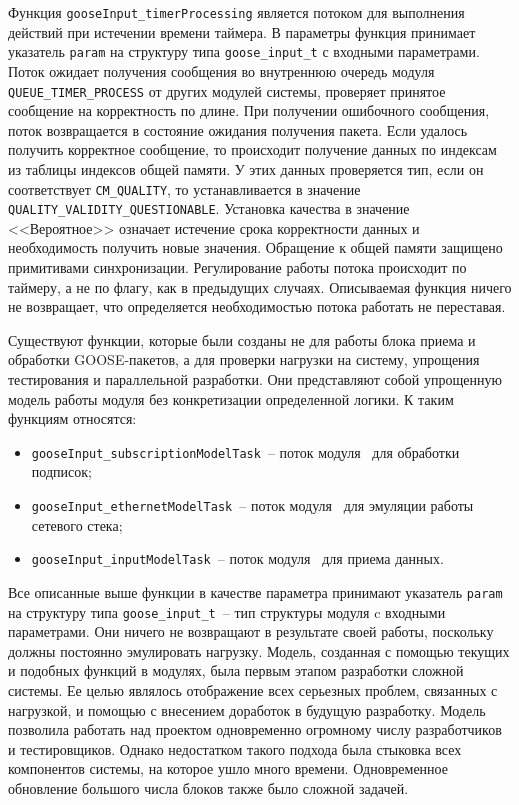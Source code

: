 Функция \lstinline{gooseInput_timerProcessing} является потоком для выполнения действий при истечении времени таймера. В параметры функция принимает указатель \lstinline{param} на структуру типа \lstinline{goose_input_t} с входными параметрами. Поток ожидает получения сообщения во внутреннюю очередь модуля \lstinline{QUEUE_TIMER_PROCESS} от других модулей системы, проверяет принятое сообщение на корректность по длине. При получении ошибочного сообщения, поток возвращается в состояние ожидания получения пакета. Если удалось получить корректное сообщение, то происходит получение данных по индексам из таблицы индексов общей памяти. У этих данных проверяется тип, если он соответствует \lstinline{CM_QUALITY}, то устанавливается в значение \lstinline{QUALITY_VALIDITY_QUESTIONABLE}.
Установка качества в значение <<Вероятное>> означает истечение срока корректности данных и необходимость получить новые значения.
Обращение к общей памяти защищено примитивами синхронизации. Регулирование работы потока происходит по таймеру, а не по флагу, как в предыдущих случаях. Описываемая функция ничего не возвращает, что определяется необходимостью потока работать не переставая.

Существуют функции, которые были созданы не для работы блока приема и обработки GOOSE-пакетов, а для проверки нагрузки на систему, упрощения тестирования и параллельной разработки. Они представляют собой упрощенную модель работы модуля без конкретизации определенной логики. К таким функциям относятся:

\begin{itemize}
    \item \lstinline{gooseInput_subscriptionModelTask}~-- поток модуля \moduleRecvPackets\ для обработки подписок;
    \item \lstinline{gooseInput_ethernetModelTask}~-- поток модуля \moduleRecvPackets\ для эмуляции работы сетевого стека;
    \item \lstinline{gooseInput_inputModelTask}~-- поток модуля \moduleRecvPackets\ для приема данных.
\end{itemize}

Все описанные выше функции в качестве параметра принимают указатель \lstinline{param} на структуру типа \lstinline{goose_input_t}~-- тип структуры модуля c входными параметрами. Они ничего не возвращают в результате своей работы,
поскольку должны постоянно эмулировать нагрузку. Модель, созданная с помощью текущих и подобных функций в модулях, была первым этапом разработки сложной системы. Ее целью являлось отображение всех серьезных проблем, связанных с нагрузкой, и помощью с внесением доработок в будущую разработку. Модель позволила работать над проектом одновременно огромному числу разработчиков и тестировщиков. Однако недостатком такого подхода была стыковка всех компонентов системы, на которое ушло много времени. Одновременное обновление большого числа блоков также было сложной задачей.

